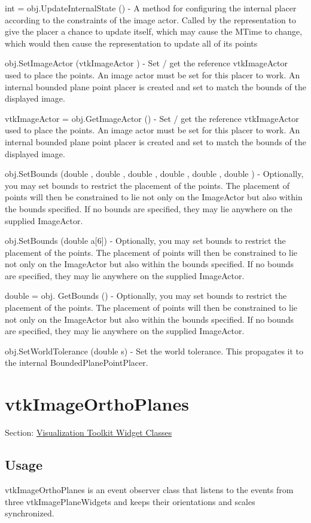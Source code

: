 \begin{DoxyItemize}
\item {\ttfamily int = obj.\-Update\-Internal\-State ()} -\/ A method for configuring the internal placer according to the constraints of the image actor. Called by the representation to give the placer a chance to update itself, which may cause the M\-Time to change, which would then cause the representation to update all of its points  
\item {\ttfamily obj.\-Set\-Image\-Actor (vtk\-Image\-Actor )} -\/ Set / get the reference vtk\-Image\-Actor used to place the points. An image actor must be set for this placer to work. An internal bounded plane point placer is created and set to match the bounds of the displayed image.  
\item {\ttfamily vtk\-Image\-Actor = obj.\-Get\-Image\-Actor ()} -\/ Set / get the reference vtk\-Image\-Actor used to place the points. An image actor must be set for this placer to work. An internal bounded plane point placer is created and set to match the bounds of the displayed image.  
\item {\ttfamily obj.\-Set\-Bounds (double , double , double , double , double , double )} -\/ Optionally, you may set bounds to restrict the placement of the points. The placement of points will then be constrained to lie not only on the Image\-Actor but also within the bounds specified. If no bounds are specified, they may lie anywhere on the supplied Image\-Actor.  
\item {\ttfamily obj.\-Set\-Bounds (double a\mbox{[}6\mbox{]})} -\/ Optionally, you may set bounds to restrict the placement of the points. The placement of points will then be constrained to lie not only on the Image\-Actor but also within the bounds specified. If no bounds are specified, they may lie anywhere on the supplied Image\-Actor.  
\item {\ttfamily double = obj. Get\-Bounds ()} -\/ Optionally, you may set bounds to restrict the placement of the points. The placement of points will then be constrained to lie not only on the Image\-Actor but also within the bounds specified. If no bounds are specified, they may lie anywhere on the supplied Image\-Actor.  
\item {\ttfamily obj.\-Set\-World\-Tolerance (double s)} -\/ Set the world tolerance. This propagates it to the internal Bounded\-Plane\-Point\-Placer.  
\end{DoxyItemize}\hypertarget{vtkwidgets_vtkimageorthoplanes}{}\section{vtk\-Image\-Ortho\-Planes}\label{vtkwidgets_vtkimageorthoplanes}
Section\-: \hyperlink{sec_vtkwidgets}{Visualization Toolkit Widget Classes} \hypertarget{vtkwidgets_vtkxyplotwidget_Usage}{}\subsection{Usage}\label{vtkwidgets_vtkxyplotwidget_Usage}
vtk\-Image\-Ortho\-Planes is an event observer class that listens to the events from three vtk\-Image\-Plane\-Widgets and keeps their orientations and scales synchronized.

